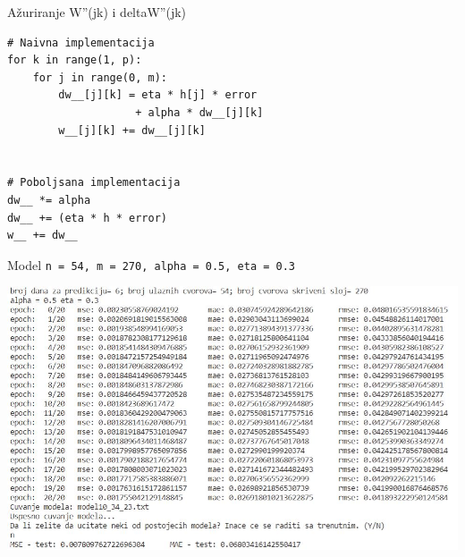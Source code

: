 \documentclass{beamer}
\begin{document}
\begin{frame}[fragile]{Ažuriranje W''(jk) i deltaW''(jk)}
    \begin{verbatim}
# Naivna implementacija
for k in range(1, p):
    for j in range(0, m):
        dw__[j][k] = eta * h[j] * error 
                    + alpha * dw__[j][k]
        w__[j][k] += dw__[j][k]
        

# Poboljsana implementacija
dw__ *= alpha
dw__ += (eta * h * error)
w__ += dw__
    \end{verbatim}
\end{frame}




\begin{frame}{\small{Model \texttt{n = 54, m = 270, alpha = 0.5, eta = 0.3}}}
    \begin{center}
    \includegraphics[scale=0.55]{output/output_example_program_10_34_23.JPG}
    \end{center}
\end{frame}
\end{document}

